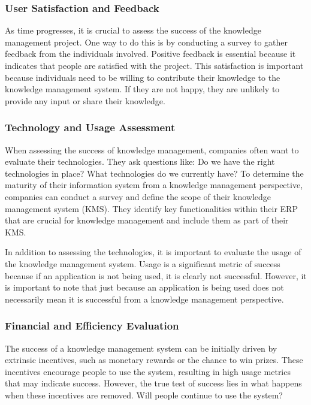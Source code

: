 \subsubsection{User Satisfaction and
    Feedback}\label{user-satisfaction-and-feedback}

As time progresses, it is crucial to assess the success of the knowledge
management project. One way to do this is by conducting a survey to
gather feedback from the individuals involved. Positive feedback is
essential because it indicates that people are satisfied with the
project. This satisfaction is important because individuals need to be
willing to contribute their knowledge to the knowledge management
system. If they are not happy, they are unlikely to provide any input or
share their knowledge.

\subsubsection{Technology and Usage
    Assessment}\label{technology-and-usage-assessment}

When assessing the success of knowledge management, companies often want
to evaluate their technologies. They ask questions like: Do we have the
right technologies in place? What technologies do we currently have? To
determine the maturity of their information system from a knowledge
management perspective, companies can conduct a survey and define the
scope of their knowledge management system (KMS). They identify key
functionalities within their ERP that are crucial for knowledge
management and include them as part of their KMS.

In addition to assessing the technologies, it is important to evaluate
the usage of the knowledge management system. Usage is a significant
metric of success because if an application is not being used, it is
clearly not successful. However, it is important to note that just
because an application is being used does not necessarily mean it is
successful from a knowledge management perspective.

\subsubsection{Financial and Efficiency
    Evaluation}\label{financial-and-efficiency-evaluation}

The success of a knowledge management system can be initially driven by
extrinsic incentives, such as monetary rewards or the chance to win
prizes. These incentives encourage people to use the system, resulting
in high usage metrics that may indicate success. However, the true test
of success lies in what happens when these incentives are removed. Will
people continue to use the system?


